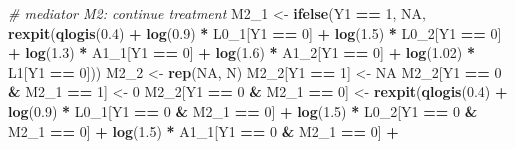 \documentclass[
]{book}
\newenvironment{Shaded}{\begin{snugshade}}{\end{snugshade}}
\newcommand{\CommentTok}[1]{\textcolor[rgb]{0.56,0.35,0.01}{\textit{#1}}}
\newcommand{\ConstantTok}[1]{\textcolor[rgb]{0.56,0.35,0.01}{#1}}
\newcommand{\DecValTok}[1]{\textcolor[rgb]{0.00,0.00,0.81}{#1}}
\newcommand{\FloatTok}[1]{\textcolor[rgb]{0.00,0.00,0.81}{#1}}
\newcommand{\FunctionTok}[1]{\textcolor[rgb]{0.13,0.29,0.53}{\textbf{#1}}}
\newcommand{\NormalTok}[1]{#1}
\newcommand{\OtherTok}[1]{\textcolor[rgb]{0.56,0.35,0.01}{#1}}
\newcommand{\SpecialCharTok}[1]{\textcolor[rgb]{0.81,0.36,0.00}{\textbf{#1}}}
\begin{document}
\begin{Shaded}
\begin{Highlighting}[]
  \CommentTok{\# mediator M2: continue treatment}
\NormalTok{  M2\_1 }\OtherTok{\textless{}{-}} \FunctionTok{ifelse}\NormalTok{(Y1 }\SpecialCharTok{==} \DecValTok{1}\NormalTok{, }
                 \ConstantTok{NA}\NormalTok{, }
                 \FunctionTok{rexpit}\NormalTok{(}\FunctionTok{qlogis}\NormalTok{(}\FloatTok{0.4}\NormalTok{) }\SpecialCharTok{+} \FunctionTok{log}\NormalTok{(}\FloatTok{0.9}\NormalTok{) }\SpecialCharTok{*}\NormalTok{ L0\_1[Y1 }\SpecialCharTok{==} \DecValTok{0}\NormalTok{]  }\SpecialCharTok{+} 
                          \FunctionTok{log}\NormalTok{(}\FloatTok{1.5}\NormalTok{) }\SpecialCharTok{*}\NormalTok{ L0\_2[Y1 }\SpecialCharTok{==} \DecValTok{0}\NormalTok{] }\SpecialCharTok{+} 
                          \FunctionTok{log}\NormalTok{(}\FloatTok{1.3}\NormalTok{) }\SpecialCharTok{*}\NormalTok{ A1\_1[Y1 }\SpecialCharTok{==} \DecValTok{0}\NormalTok{] }\SpecialCharTok{+} \FunctionTok{log}\NormalTok{(}\FloatTok{1.6}\NormalTok{) }\SpecialCharTok{*}\NormalTok{ A1\_2[Y1 }\SpecialCharTok{==} \DecValTok{0}\NormalTok{] }\SpecialCharTok{+} 
                          \FunctionTok{log}\NormalTok{(}\FloatTok{1.02}\NormalTok{) }\SpecialCharTok{*}\NormalTok{ L1[Y1 }\SpecialCharTok{==} \DecValTok{0}\NormalTok{]))}
\NormalTok{  M2\_2 }\OtherTok{\textless{}{-}} \FunctionTok{rep}\NormalTok{(}\ConstantTok{NA}\NormalTok{, N)}
\NormalTok{  M2\_2[Y1 }\SpecialCharTok{==} \DecValTok{1}\NormalTok{] }\OtherTok{\textless{}{-}} \ConstantTok{NA}
\NormalTok{  M2\_2[Y1 }\SpecialCharTok{==} \DecValTok{0} \SpecialCharTok{\&}\NormalTok{ M2\_1 }\SpecialCharTok{==} \DecValTok{1}\NormalTok{] }\OtherTok{\textless{}{-}} \DecValTok{0}
\NormalTok{  M2\_2[Y1 }\SpecialCharTok{==} \DecValTok{0} \SpecialCharTok{\&}\NormalTok{ M2\_1 }\SpecialCharTok{==} \DecValTok{0}\NormalTok{] }\OtherTok{\textless{}{-}} \FunctionTok{rexpit}\NormalTok{(}\FunctionTok{qlogis}\NormalTok{(}\FloatTok{0.4}\NormalTok{) }\SpecialCharTok{+} 
                                        \FunctionTok{log}\NormalTok{(}\FloatTok{0.9}\NormalTok{) }\SpecialCharTok{*}\NormalTok{ L0\_1[Y1 }\SpecialCharTok{==} \DecValTok{0} \SpecialCharTok{\&}\NormalTok{ M2\_1 }\SpecialCharTok{==} \DecValTok{0}\NormalTok{]  }\SpecialCharTok{+} 
                                        \FunctionTok{log}\NormalTok{(}\FloatTok{1.5}\NormalTok{) }\SpecialCharTok{*}\NormalTok{ L0\_2[Y1 }\SpecialCharTok{==} \DecValTok{0} \SpecialCharTok{\&}\NormalTok{ M2\_1 }\SpecialCharTok{==} \DecValTok{0}\NormalTok{] }\SpecialCharTok{+} 
                                        \FunctionTok{log}\NormalTok{(}\FloatTok{1.5}\NormalTok{) }\SpecialCharTok{*}\NormalTok{ A1\_1[Y1 }\SpecialCharTok{==} \DecValTok{0} \SpecialCharTok{\&}\NormalTok{ M2\_1 }\SpecialCharTok{==} \DecValTok{0}\NormalTok{] }\SpecialCharTok{+} 

\end{Highlighting}
\end{Shaded}
\end{document}
